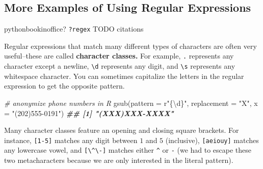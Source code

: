 \documentclass[
  12pt,
  krantz2]{krantz}
\makeatletter
\newenvironment{Shaded}{\begin{snugshade}}{\end{snugshade}}
\newcommand{\AttributeTok}[1]{\textcolor[rgb]{0.61,0.61,0.61}{#1}}
\newcommand{\BuiltInTok}[1]{#1}
\newcommand{\CommentTok}[1]{\textcolor[rgb]{0.37,0.37,0.37}{\textit{#1}}}
\newcommand{\DocumentationTok}[1]{\textcolor[rgb]{0.37,0.37,0.37}{\textbf{\textit{#1}}}}
\newcommand{\FunctionTok}[1]{\textcolor[rgb]{0,0,0}{#1}}
\newcommand{\NormalTok}[1]{#1}
\newcommand{\OperatorTok}[1]{\textcolor[rgb]{0.43,0.43,0.43}{\textbf{#1}}}
\newcommand{\StringTok}[1]{\textcolor[rgb]{0.5,0.5,0.5}{#1}}
\newenvironment{kframe}{%
\medskip{}
\setlength{\fboxsep}{.8em}
 \def\at@end@of@kframe{}%
 \ifinner\ifhmode%
  \def\at@end@of@kframe{\end{minipage}}%
  \begin{minipage}{\columnwidth}%
 \fi\fi%
 \def\FrameCommand##1{\hskip\@totalleftmargin \hskip-\fboxsep
 \colorbox{shadecolor}{##1}\hskip-\fboxsep
     \hskip-\linewidth \hskip-\@totalleftmargin \hskip\columnwidth}%
 \MakeFramed {\advance\hsize-\width
   \@totalleftmargin\z@ \linewidth\hsize
   \@setminipage}}%
 {\par\unskip\endMakeFramed%
 \at@end@of@kframe}
\renewenvironment{Shaded}{\begin{kframe}}{\end{kframe}}
\makeatother
\begin{document}
\begin{Shaded}
\end{Shaded}

\hypertarget{more-examples-of-using-regular-expressions}{%
\subsection{More Examples of Using Regular Expressions}\label{more-examples-of-using-regular-expressions}}

\citep{rfords} pythonbookinoffice? \texttt{?regex} TODO citations

Regular expressions that match many different types of characters are often very useful--these are called \textbf{character classes.} For example, \texttt{.} represents any character except a newline, \texttt{\textbackslash{}d} represents any digit, and \texttt{\textbackslash{}s} represents any whitespace character. You can sometimes capitalize the letters in the regular expression to get the opposite pattern.

\begin{Shaded}
\begin{Highlighting}[]
\CommentTok{\# anonymize phone numbers in R}
\FunctionTok{gsub}\NormalTok{(}\AttributeTok{pattern =}\NormalTok{ r}\StringTok{"\{\textbackslash{}d\}"}\NormalTok{, }\AttributeTok{replacement =} \StringTok{"X"}\NormalTok{, }\AttributeTok{x =} \StringTok{"(202)555{-}0191"}\NormalTok{)}
\DocumentationTok{\#\# [1] "(XXX)XXX{-}XXXX"}
\end{Highlighting}
\end{Shaded}

\begin{Shaded}
\end{Shaded}

Many character classes feature an opening and closing square brackets. For instance, \texttt{{[}1-5{]}} matches any digit between \(1\) and \(5\) (inclusive), \texttt{{[}aeiouy{]}} matches any lowercase vowel, and \texttt{{[}\textbackslash{}\^{}\textbackslash{}-{]}} matches either \texttt{\^{}} or \texttt{-} (we had to escape these two metacharacters because we are only interested in the literal pattern).
\end{document}
